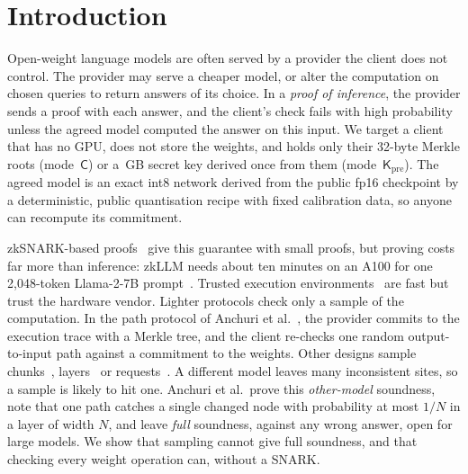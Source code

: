 \providecommand{\para}[1]{\par\noindent\textbf{#1}\quad}
\providecommand{\todo}[1]{\textbf{[TODO: #1]}}
\providecommand{\sC}{\mathsf{C}}
\providecommand{\sK}{\mathsf{K}}
\providecommand{\Kpre}{\mathsf{K}_{\mathrm{pre}}}

\section{Introduction}
\label{sec:intro}

Open-weight language models are often served by a provider the client does not control. The provider
may serve a cheaper model, or alter the computation on chosen queries to return answers of its
choice. In a \emph{proof of inference}, the provider sends a proof with each answer, and
the client's check fails with high probability unless the agreed model computed the answer on this
input. We target a client that has no GPU, does not store the weights, and holds only their 32-byte
Merkle roots (mode~$\sC$) or a \KpreStoreGB{}\,GB secret key derived once from them
(mode~$\Kpre$). The agreed model is an exact int8 network derived from the public
fp16 checkpoint by a deterministic, public quantisation recipe with fixed calibration data, so
anyone can recompute its commitment.

zkSNARK-based proofs~\cite{zkcnn,zkml,ezkl,zkllm,zkgpt,deepprove,zktorch} give this guarantee with
small proofs, but proving costs far more than inference: zkLLM needs about ten minutes on an A100
for one 2{,}048-token Llama-2-7B prompt~\cite{zkllm}. Trusted execution
environments~\cite{slalom,twinshield,veriattn,gpucc} are fast but trust the hardware vendor. Lighter
protocols check only a sample of the computation. In the path protocol of Anchuri et
al.~\cite{anchuri2026verifiable}, the provider commits to the execution trace with a Merkle tree,
and the client re-checks one random output-to-input path against a commitment to the weights. Other
designs sample chunks~\cite{slp}, layers~\cite{tensorcommitments,nanozk,commitllm2026} or
requests~\cite{spex,immaculate}. A different model leaves many inconsistent sites, so a sample is
likely to hit one. Anchuri et al.\ prove this \emph{other-model} soundness, note that one path
catches a single changed node with probability at most $1/N$ in a layer of width $N$, and leave
\emph{full} soundness, against any wrong answer, open for large models. We show that sampling
cannot give full soundness, and that checking every weight operation can, without a SNARK.

